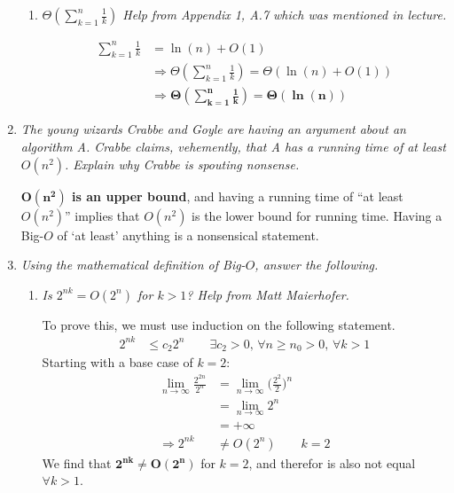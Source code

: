 \documentclass[12pt]{article}
\begin{document}
\begin{enumerate}
\begin{enumerate}
    \item \textit{$\Theta(\sum\limits_{k=1}^{n}\frac{1}{k})$ Help from Appendix 1, A.7 which was mentioned in lecture.}
    
	\begin{align*}
    \sum\limits_{k=1}^{n}\frac{1}{k} &= \ln(n) + O(1) \\
    &\Rightarrow \Theta(\sum\limits_{k=1}^{n}\frac{1}{k}) = \Theta(\ln(n) + O(1)) \\
    &\Rightarrow \mathbf{\Theta(\sum\limits_{k=1}^{n}\frac{1}{k}) = \Theta(\ln(n))}
    \end{align*}
    
	\end{enumerate}
	
    \newpage
    \item \textit{The young wizards Crabbe and Goyle are having an argument about an algorithm \textsc{A}. Crabbe claims, vehemently, that \textsc{A} has a running time of at least $O(n^2)$. Explain why Crabbe is spouting 
nonsense.}
    
    \textbf{$\mathbf{O(n^2)}$ is an upper bound}, and having a running time of ``at least $O(n^2)$'' implies that $O(n^2)$ is the lower bound for running time. Having a Big-$O$ of `at least' anything is a nonsensical statement.
    
    \newpage
    \item \textit{Using the mathematical definition of Big-$O$, answer the following.}
    \begin{enumerate}
    \item \textit{Is $2^{nk} = O(2^n)$ for $k > 1$? Help from Matt Maierhofer.}
    
    To prove this, we must use induction on the following statement.
    \begin{align*}
    2^{nk} &\leq c_2 2^n \qquad \exists c_2 > 0, \, \forall n\geq n_0 > 0, \, \forall k > 1 
    \end{align*}
	Starting with a base case of $k=2$:
    \begin{align*}
    \lim_{n\to\infty}\frac{2^{2n}}{2^n} &= \lim_{n\to\infty}\bigg(\frac{2^2}{2}\bigg)^n \\
    &= \lim_{n\to\infty}2^n \\
    &= +\infty \\
    \Rightarrow 2^{nk} &\neq O(2^n) \qquad k = 2 
    \end{align*}
    We find that $\mathbf{2^{nk} \neq O(2^n)}$ for $k=2$, and therefor is also not equal $\forall k > 1$. \\


\end{enumerate}
\end{enumerate}
\end{document}

